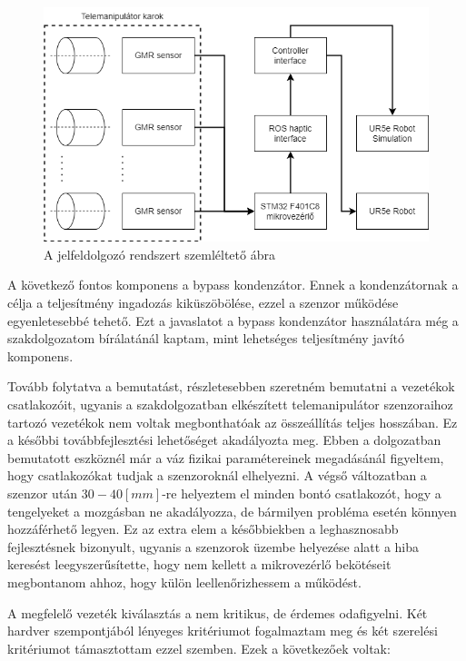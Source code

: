 \begin{figure}[!ht]
\centering
\includegraphics[width=135mm, keepaspectratio]{figures/Diagrammok/Telemanipulator_teljesrendszer}
\caption{A jelfeldolgozó rendszert szemléltető ábra}
\label{fig:Telemanipulator_teljesrendszer}
\end{figure}

A következő fontos komponens a bypass kondenzátor. Ennek a kondenzátornak a célja a teljesítmény ingadozás kiküszöbölése, ezzel a szenzor működése egyenletesebbé tehető. Ezt a javaslatot a bypass kondenzátor használatára még a szakdolgozatom bírálatánál kaptam, mint lehetséges teljesítmény javító komponens.

Tovább folytatva a bemutatást, részletesebben szeretném bemutatni a vezetékok csatlakozóit, ugyanis a szakdolgozatban elkészített telemanipulátor szenzoraihoz tartozó vezetékok nem voltak megbonthatóak az összeállítás teljes hosszában. Ez a későbbi továbbfejlesztési lehetőséget akadályozta meg. Ebben a dolgozatban bemutatott eszköznél már a váz fizikai paramétereinek megadásánál figyeltem, hogy csatlakozókat tudjak a szenzoroknál elhelyezni. A végső változatban a szenzor után $30-40[mm]$-re helyeztem el minden bontó csatlakozót, hogy a tengelyeket a mozgásban ne akadályozza, de bármilyen probléma esetén könnyen hozzáférhető legyen. Ez az extra elem a későbbiekben a leghasznosabb fejlesztésnek bizonyult, ugyanis a szenzorok üzembe helyezése alatt a hiba keresést leegyszerűsítette, hogy nem kellett a mikrovezérlő bekötéseit megbontanom ahhoz, hogy külön leellenőrizhessem a működést.

A megfelelő vezeték kiválasztás a nem kritikus, de érdemes odafigyelni. Két hardver szempontjából lényeges kritériumot fogalmaztam meg és két szerelési kritériumot támasztottam ezzel szemben. Ezek a következőek voltak:

